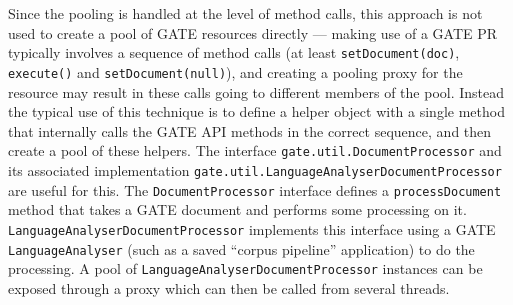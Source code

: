 Since the pooling is handled at the level of method calls, this approach is not
used to create a pool of GATE resources directly --- making use of a GATE PR
typically involves a sequence of method calls (at least \verb|setDocument(doc)|,
\verb|execute()| and \verb|setDocument(null)|), and creating a pooling proxy
for the resource may result in these calls going to different members of the
pool.  Instead the typical use of this technique is to define a helper object
with a single method that internally calls the GATE API methods in the correct
sequence, and then create a pool of these helpers.  The interface
\verb|gate.util.DocumentProcessor| and its associated implementation
\verb|gate.util.LanguageAnalyserDocumentProcessor| are useful for this.  The
\verb|DocumentProcessor| interface defines a \verb|processDocument| method that
takes a GATE document and performs some processing on it.
\verb|LanguageAnalyserDocumentProcessor| implements this interface using a GATE
\verb|LanguageAnalyser| (such as a saved ``corpus pipeline'' application) to do
the processing.  A pool of \verb|LanguageAnalyserDocumentProcessor| instances
can be exposed through a proxy which can then be called from several threads.

